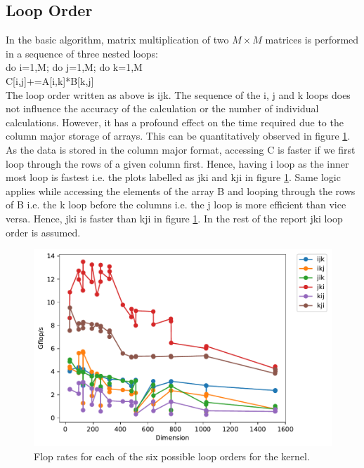 \documentclass{article}
\begin{document}
\subsection{Loop Order}
In the basic algorithm, matrix multiplication of two $M\times M$ matrices is performed in a sequence of three nested loops:
\\do i=1,M;	do j=1,M;	do k=1,M
\\ C[i,j]+=A[i,k]*B[k,j]\\
The loop order written as above is ijk.
The sequence of the i, j and k loops does not influence the accuracy of the calculation or the number of individual calculations. However, it has a profound effect on the time required due to the column major storage of arrays. This can be quantitatively observed in figure \ref{fig:LoopOrder}. As the data is stored in the column major format, accessing C is faster if we first loop through the rows of a given column first. Hence, having i loop as the inner most loop is fastest i.e. the plots labelled as jki and kji in figure \ref{fig:LoopOrder}. Same logic applies while accessing the elements of the array B and looping through the rows of B i.e. the k loop before the columns i.e. the j loop is more efficient than vice versa. Hence, jki is faster than kji in figure \ref{fig:LoopOrder}. In the rest of the report jki loop order is assumed.
\begin{figure}[h!]
    \centering
    \includegraphics[width=0.8\columnwidth]{timing_loop_order.pdf}
    \caption{Flop rates for each of the six possible loop orders for the kernel.}
    \label{fig:LoopOrder}
\end{figure}
\end{document}
